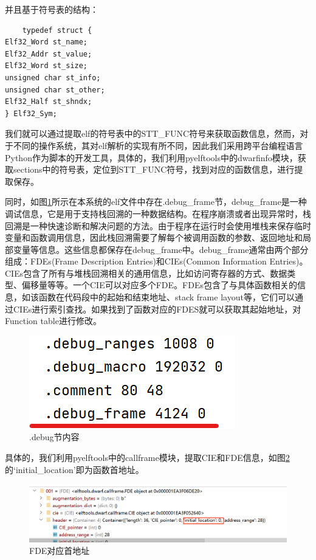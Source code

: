 \documentclass[12pt,a4paper]{ctexart}
\numberwithin{figure}{section}
\begin{document}
\par 并且基于符号表的结构：
\begin{verbatim}
    typedef struct { 
Elf32_Word st_name; 
Elf32_Addr st_value; 
Elf32_Word st_size; 
unsigned char st_info; 
unsigned char st_other; 
Elf32_Half st_shndx; 
} Elf32_Sym;
\end{verbatim}
\par 我们就可以通过提取elf的符号表中的STT\_FUNC符号来获取函数信息，然而，对于不同的操作系统，其对elf解析的实现有所不同，因此我们采用跨平台编程语言Python作为脚本的开发工具，具体的，我们利用pyelftools中的dwarfinfo模块，获取sections中的符号表，定位到STT\_FUNC符号，找到对应的函数信息，进行提取保存。
\par 同时，如图\ref{df}所示在本系统的elf文件中存在.debug\_frame节，debug\_frame是一种调试信息，它是用于支持栈回溯的一种数据结构。在程序崩溃或者出现异常时，栈回溯是一种快速诊断和解决问题的方法。由于程序在运行时会使用堆栈来保存临时变量和函数调用信息，因此栈回溯需要了解每个被调用函数的参数、返回地址和局部变量等信息。这些信息都保存在debug\_frame中。debug\_frame通常由两个部分组成：FDEs(Frame Description Entries)和CIEs(Common Information Entries)。CIEs包含了所有与堆栈回溯相关的通用信息，比如访问寄存器的方式、数据类型、偏移量等等。一个CIE可以对应多个FDE。FDEs包含了与具体函数相关的信息，如该函数在代码段中的起始和结束地址、stack frame layout等，它们可以通过CIEs进行索引查找。如果找到了函数对应的FDES就可以获取其起始地址，对Function table进行修改。
\begin{figure}
    \centering
    \includegraphics[scale=1]{graph/debug_frame.png}
    \caption{.debug节内容}
    \label{df}
\end{figure}
\par 具体的，我们利用pyelftools中的callframe模块，提取CIE和FDE信息，如图\ref{id}的‘initial\_location’即为函数首地址。
\begin{figure}
    \centering
    \includegraphics[scale=0.3]{graph/initial_addresspng.png}
    \caption{FDE对应首地址}
    \label{id}
\end{figure}
\end{document}
